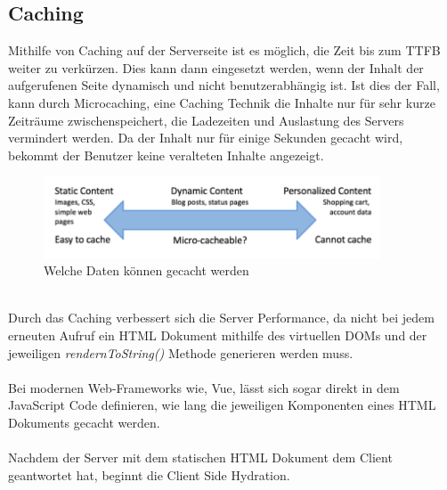 \documentclass[runningheads]{llncs}
\numberwithin{figure}{section}
\begin{document}
\subsection{Caching}
\label{subsec:Caching}
Mithilfe von Caching auf der Serverseite ist es möglich, 
die Zeit bis zum TTFB weiter zu verkürzen. 
Dies kann dann eingesetzt werden, 
wenn der Inhalt der aufgerufenen Seite dynamisch und nicht benutzerabhängig ist. 
Ist dies der Fall, kann durch Microcaching, 
eine Caching Technik die Inhalte nur für sehr kurze Zeiträume zwischenspeichert, 
die Ladezeiten und Auslastung des Servers vermindert werden. 
Da der Inhalt nur für einige Sekunden gecacht wird, 
bekommt der Benutzer keine veralteten Inhalte angezeigt. \cite{garett_2015}
\begin{figure}[h]
  \centering
  \includegraphics[width=10cm]{images/caching}
  \caption{Welche Daten können gecacht werden \cite{garett_2015}}
\end{figure}
\\
Durch das Caching verbessert sich die Server Performance, 
da nicht bei jedem erneuten Aufruf ein HTML Dokument mithilfe des virtuellen DOMs und 
der jeweiligen \textit{rendernToString()} Methode generieren werden muss. 
\\
\\
Bei modernen Web-Frameworks wie, Vue, 
lässt sich sogar direkt in dem JavaScript Code definieren, 
wie lang die jeweiligen Komponenten eines HTML Dokuments gecacht werden. 
\\
\\
Nachdem der Server mit dem statischen HTML Dokument dem Client geantwortet hat, 
beginnt die Client Side Hydration.
\end{document}
